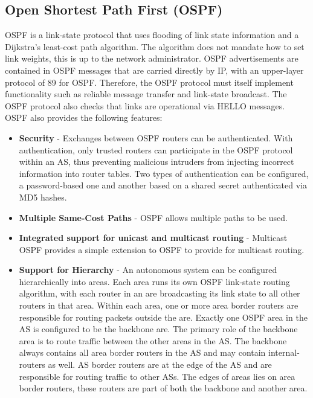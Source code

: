 \subsection{Open Shortest Path First (OSPF)}
OSPF is a link-state protocol that uses flooding of link state information and a Dijkstra's least-cost path algorithm. The algorithm does not mandate how to set link weights, this is up to the network administrator. OSPF advertisements are contained in OSPF messages that are carried directly by IP, with an upper-layer protocol of 89 for OSPF. Therefore, the OSPF protocol must itself implement functionality such as reliable message transfer and link-state broadcast. The OSPF protocol also checks that links are operational via HELLO messages. OSPF also provides the following features:
\begin{itemize}
\item \textbf{Security} - Exchanges between OSPF routers can be authenticated. With authentication, only trusted routers can participate in the OSPF protocol within an AS, thus preventing malicious intruders from injecting incorrect information into router tables. Two types of authentication can be configured, a password-based one and another based on a shared secret authenticated via MD5 hashes.
\item \textbf{Multiple Same-Cost Paths} - OSPF allows multiple paths to be used.
\item \textbf{Integrated support for unicast and multicast routing} - Multicast OSPF provides a simple extension to OSPF to provide for multicast routing.
\item \textbf{Support for Hierarchy} - An autonomous system can be configured hierarchically into areas. Each area runs its own OSPF link-state routing algorithm, with each router in an are broadcasting its link state to all other routers in that area. Within each area, one or more area border routers are responsible for routing packets outside the are. Exactly one OSPF area in the AS is configured to be the backbone are. The primary role of the backbone area is to route traffic between the other areas in the AS. The backbone always contains all area border routers in the AS and may contain internal-routers as well. AS border routers are at the edge of the AS and are responsible for routing traffic to other ASs. The edges of areas lies on area border routers, these routers are part of both the backbone and another area.
\end{itemize}

